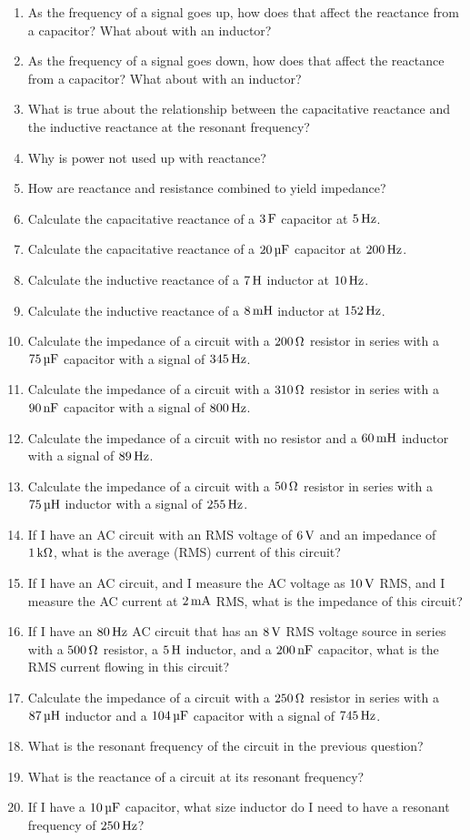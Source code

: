 \exercisesection

\begin{enumerate}
\item As the frequency of a signal goes up, how does that affect the reactance from a capacitor?  What about with an inductor?
\item As the frequency of a signal goes down, how does that affect the reactance from a capacitor?  What about with an inductor?
\item What is true about the relationship between the capacitative reactance and the inductive reactance at the resonant frequency?
\item Why is power not used up with reactance?
\item How are reactance and resistance combined to yield impedance?
\item Calculate the capacitative reactance of a $3\,\si{\farad}$ capacitor at $5\,\si{\hertz}$.
\item Calculate the capacitative reactance of a $20\,\si{\micro\farad}$ capacitor at $200\,\si{\hertz}$.
\item Calculate the inductive reactance of a $7\myhy$ inductor at $10\,\si{\hertz}$.
\item Calculate the inductive reactance of a $8\mymhy$ inductor at $152\,\si{\hertz}$.
\item Calculate the impedance of a circuit with a $200\,\si{\ohm}$ resistor in series with a $75\,\si{\micro\farad}$ capacitor with a signal of $345\,\si{\hertz}$.
\item Calculate the impedance of a circuit with a $310\,\si{\ohm}$ resistor in series with a $90\,\si{\nano\farad}$ capacitor with a signal of $800\,\si{\hertz}$.
\item Calculate the impedance of a circuit with no resistor and a $60\mymhy$ inductor with a signal of $89\,\si{\hertz}$.
\item Calculate the impedance of a circuit with a $50\,\si{\ohm}$ resistor in series with a $75\myuhy$ inductor with a signal of $255\,\si{\hertz}$.
\item If I have an AC circuit with an RMS voltage of $6\,\si{\volt}$ and an impedance of $1\,\si{\kilo\ohm}$, what is the average (RMS) current of this circuit?
\item If I have an AC circuit, and I measure the AC voltage as $10\,\si{\volt}$ RMS, and I measure the AC current at $2\,\si{\milli\ampere}$ RMS, what is the impedance of this circuit?
\item If I have an $80\,\si{\hertz}$ AC circuit that has an $8\,\si{\volt}$ RMS voltage source in series with a $500\,\si{\ohm}$ resistor, a $5\myhy$ inductor, and a $200\,\si{\nano\farad}$ capacitor, what is the RMS current flowing in this circuit?
\item Calculate the impedance of a circuit with a $250\,\si{\ohm}$ resistor in series with a $87\myuhy$ inductor and a $104\,\si{\micro\farad}$ capacitor with a signal of $745\,\si{\hertz}$.
\item What is the resonant frequency of the circuit in the previous question?
\item What is the reactance of a circuit at its resonant frequency?
\item If I have a $10\,\si{\micro\farad}$ capacitor, what size inductor do I need to have a resonant frequency of $250\,\si{\hertz}$?
\end{enumerate}
